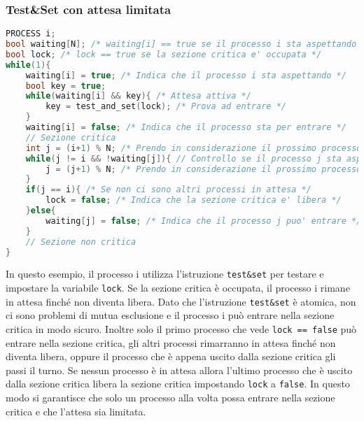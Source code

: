         \subsubsection{Test\&Set con attesa limitata}
            \begin{lstlisting}[language=C++,basicstyle=\footnotesize]
PROCESS i;
bool waiting[N]; /* waiting[i] == true se il processo i sta aspettando */
bool lock; /* lock == true se la sezione critica e' occupata */
while(1){
    waiting[i] = true; /* Indica che il processo i sta aspettando */
    bool key = true;
    while(waiting[i] && key){ /* Attesa attiva */
        key = test_and_set(lock); /* Prova ad entrare */
    }
    waiting[i] = false; /* Indica che il processo sta per entrare */
    // Sezione critica
    int j = (i+1) % N; /* Prendo in considerazione il prossimo processo */
    while(j != i && !waiting[j]){ // Controllo se il processo j sta aspettando
        j = (j+1) % N; /* Prendo in considerazione il prossimo processo */
    } 
    if(j == i){ /* Se non ci sono altri processi in attesa */
        lock = false; /* Indica che la sezione critica e' libera */
    }else{
        waiting[j] = false; /* Indica che il processo j puo' entrare */
    }
    // Sezione non critica
}
            \end{lstlisting}
            In questo esempio, il processo i utilizza l'istruzione \texttt{test\&set} per testare e impostare la variabile \texttt{lock}. Se la sezione critica è occupata, il processo i rimane in attesa finché non diventa libera. Dato che l'istruzione \texttt{test\&set} è atomica, non ci sono problemi di mutua esclusione e il processo i può entrare nella sezione critica in modo sicuro. Inoltre solo il primo processo che vede \texttt{lock == false} può entrare nella sezione critica, gli altri processi rimarranno in attesa finché non diventa libera, oppure il processo che è appena uscito dalla sezione critica gli passi il turno. Se nessun processo è in attesa allora l'ultimo processo che è uscito dalla sezione critica libera la sezione critica impostando \texttt{lock} a \texttt{false}. In questo modo si garantisce che solo un processo alla volta possa entrare nella sezione critica e che l'attesa sia limitata.
    